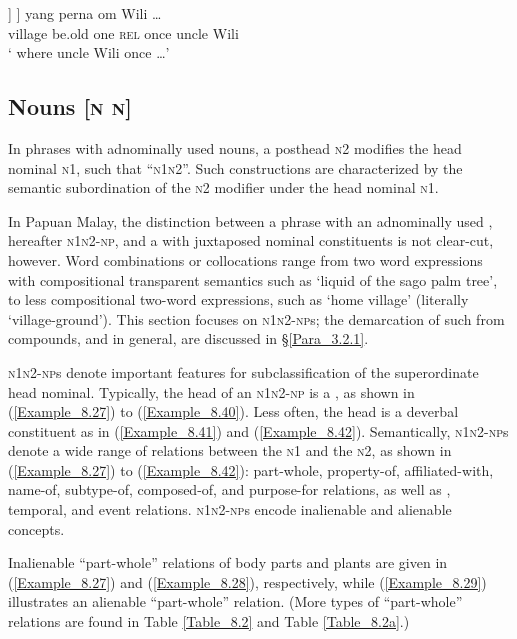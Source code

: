 \ea
\label{Example_8.26}
\gll {[[\bluebold{kampung}} {]} {]} {yang} {perna} {om} {Wili} {\ldots}\\ %
 village  be.old  one  \textsc{rel}  once  uncle  Wili  \\
\glt
‘ where uncle Wili once {\ldots}’ \textstyleExampleSource{[080922-010a-CvNF.0290]}
\z


\subsection{Nouns [\textsc{n} \textsc{n}]}
\label{Para_8.2.2}
In  phrases with adnominally used nouns, a posthead  \textsc{n2} modifies the head nominal \textsc{n1}, such that ``\textsc{n1n2}''. Such constructions are characterized by the semantic subordination of the \textsc{n2} modifier under the head nominal \textsc{n1}.



In Papuan Malay, the distinction between a  phrase with an adnominally used , hereafter \textsc{n1n2-np}, and a  with juxtaposed nominal constituents is not clear-cut, however. Word combinations or collocations range from two word expressions with compositional transparent semantics such as  ‘liquid of the sago palm tree’, to less compositional two-word expressions, such as  ‘home village’ (literally ‘village-ground’). This section focuses on \textsc{n1n2-np}s; the demarcation of such  from compounds, and  in general, are discussed in §\ref{Para_3.2.1}.



\textsc{n1n2-np}s denote important features for subclassification of the superordinate head nominal. Typically, the head of an \textsc{n1n2-np} is a , as shown in (\ref{Example_8.27}) to (\ref{Example_8.40}). Less often, the head is a deverbal constituent as in (\ref{Example_8.41}) and (\ref{Example_8.42}). Semantically, \textsc{n1n2-np}s denote a wide range of  relations between the \textsc{n1} and the \textsc{n2}, as shown in (\ref{Example_8.27}) to (\ref{Example_8.42}): part-whole, property-of, affiliated-with, name-of, subtype-of, composed-of, and purpose-for relations, as well as , temporal, and event relations. \textsc{n1n2-np}s encode inalienable and alienable concepts.



Inalienable ``part-whole'' relations of body parts and plants are given in (\ref{Example_8.27}) and (\ref{Example_8.28}), respectively, while (\ref{Example_8.29}) illustrates an alienable ``part-whole'' relation. (More types of ``part-whole'' relations are found in Table \ref{Table_8.2} and Table \ref{Table_8.2a}.)




